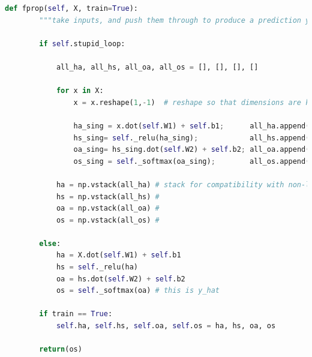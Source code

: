 \documentclass[reqno]{amsart}
\theoremstyle{definition}
\theoremstyle{remark}
\numberwithin{equation}{section}
\begin{document}
\begin{lstlisting}[language=Python]
    def fprop(self, X, train=True):                                             
        """take inputs, and push them through to produce a prediction y"""      
                                                                                
        if self.stupid_loop:                                                    
                                                                                
            all_ha, all_hs, all_oa, all_os = [], [], [], []                     
                                                                                
            for x in X:                                                         
                x = x.reshape(1,-1)  # reshape so that dimensions are kosher    
                                                                                
                ha_sing = x.dot(self.W1) + self.b1;      all_ha.append(ha_sing) 
                hs_sing= self._relu(ha_sing);            all_hs.append(hs_sing) 
                oa_sing= hs_sing.dot(self.W2) + self.b2; all_oa.append(oa_sing) 
                os_sing = self._softmax(oa_sing);        all_os.append(os_sing) 
                                                                                
            ha = np.vstack(all_ha) # stack for compatibility with non-loop      
            hs = np.vstack(all_hs) #                                            
            oa = np.vstack(all_oa) #                                            
            os = np.vstack(all_os) #                                            
                                                                                
        else:                                                                   
            ha = X.dot(self.W1) + self.b1                                       
            hs = self._relu(ha)                                                 
            oa = hs.dot(self.W2) + self.b2                                      
            os = self._softmax(oa) # this is y_hat                              
                                     
        if train == True:                                                       
            self.ha, self.hs, self.oa, self.os = ha, hs, oa, os                 
                                                                                
        return(os)                                                              
\end{lstlisting}
\end{document}
